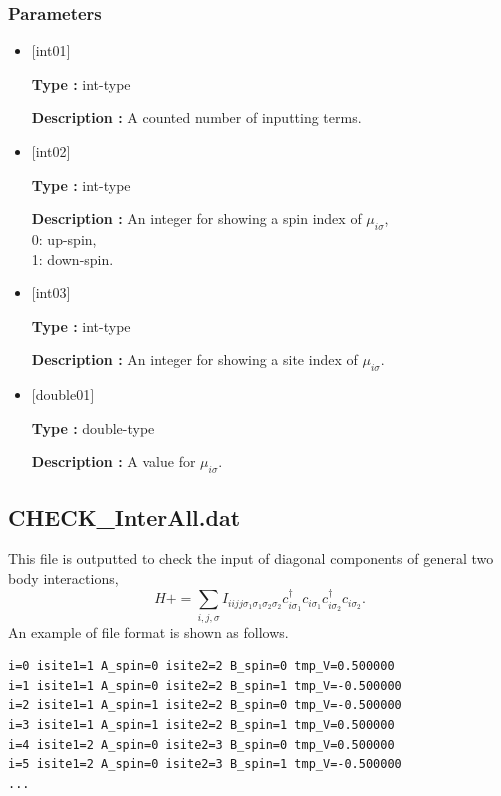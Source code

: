 \subsubsection{Parameters}
 \begin{itemize}

   \item  $[$int01$]$ 
   
    {\bf Type :} int-type

   {\bf Description :} A counted number of inputting terms.
   
   \item  $[$int02$]$ 
   
    {\bf Type :} int-type

   {\bf Description :}  An integer for showing a spin index of $\mu_{i\sigma}$,\\
0: up-spin,\\
1: down-spin.
   
   \item  $[$int03$]$ 
   
    {\bf Type :} int-type

    {\bf Description :}  An integer for showing a site index of $\mu_{i\sigma}$.
 
   \item  $[$double01$]$ 
   
    {\bf Type :} double-type

   {\bf Description :} A value for $\mu_{i\sigma}$.
     
\end{itemize}

\subsection{CHECK\_InterAll.dat}
This file is outputted to check the input of diagonal components of general two body interactions,
\begin{equation}
H+=\sum_{i,j, \sigma} I_{iijj\sigma_1\sigma_1\sigma_2\sigma_2} c_{i\sigma_1}^{\dagger}c_{i\sigma_1}c_{i\sigma_2}^{\dagger}c_{i\sigma_2}.
\end{equation}
An example of file format is shown as follows.

\begin{minipage}{12.5cm}
\begin{screen}
\begin{verbatim}
i=0 isite1=1 A_spin=0 isite2=2 B_spin=0 tmp_V=0.500000 
i=1 isite1=1 A_spin=0 isite2=2 B_spin=1 tmp_V=-0.500000 
i=2 isite1=1 A_spin=1 isite2=2 B_spin=0 tmp_V=-0.500000 
i=3 isite1=1 A_spin=1 isite2=2 B_spin=1 tmp_V=0.500000 
i=4 isite1=2 A_spin=0 isite2=3 B_spin=0 tmp_V=0.500000 
i=5 isite1=2 A_spin=0 isite2=3 B_spin=1 tmp_V=-0.500000 
...
\end{verbatim}
\end{screen}
\end{minipage}

